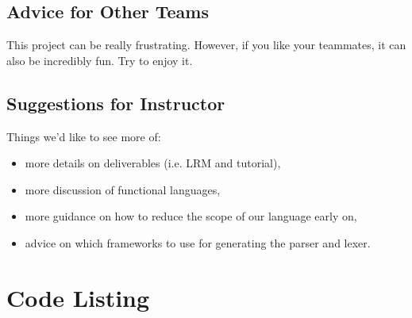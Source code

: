 \documentclass{report}
\begin{document}
\section{Advice for Other Teams}

This project can be really frustrating. However, if you like your teammates, it can also be incredibly fun. Try to enjoy it.

\section{Suggestions for Instructor}

Things we'd like to see more of:

\begin{itemize}
\item more details on deliverables (i.e. LRM and tutorial), 
\item more discussion of functional languages,
\item more guidance on how to reduce the scope of our language early on,
\item advice on which frameworks to use for generating the parser and lexer. 
\end{itemize}

\appendix

\chapter{Code Listing}
\end{document}
